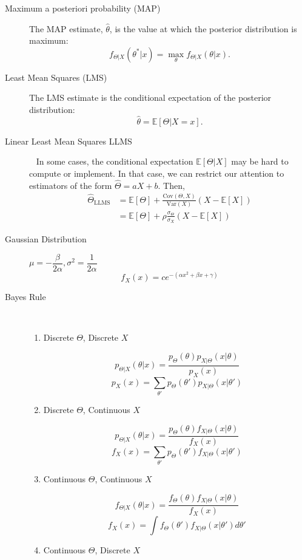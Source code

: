\documentclass[a4paper, 10pt,landscape]{article}
\newcommand{\var}{\textrm{Var}}
\newcommand{\cov}{\textrm{Cov}}
\begin{document}
\begin{multicols*}{4}
	\begin{description}
		\item[Maximum a posteriori probability (MAP)]  The MAP estimate, $\hat{\theta}$, is the value at which the posterior distribution is maximum:  $$f_{\Theta|X}(\theta^*|x)=\max\limits_{\theta}f_{\Theta|X}(\theta|x).$$
		\item[Least Mean Squares (LMS)] The LMS estimate is the conditional expectation of the posterior distribution: $$\hat{\theta}=\mathds{E}\left[\Theta|X=x\right].$$
		\item[Linear Least Mean Squares LLMS]~
			In some cases, the conditional expectation $\mathds{E}[\Theta|X]$ may be hard to compute or implement. In that case, we can restrict our attention to estimators of the form $\hat{\Theta}=aX+b.$ Then,
		\begin{align*}
			\hat{\Theta}_\text{LLMS}&=\mathds{E}[\Theta]+\frac{\cov(\Theta,X)}{\var(X)}\left(X-\mathds{E}[X]\right)\\
			&=\mathds{E}[\Theta]+\rho\frac{\sigma_\Theta}{\sigma_X}\left(X-\mathds{E}[X]\right)
		\end{align*}
		\item[Gaussian Distribution] $\mu=-\dfrac{\beta}{2\alpha}, \sigma^2=\dfrac{1}{2\alpha}$
			$$f_X(x) = c e^{-(\alpha x^2 + \beta x + \gamma)}$$
		\item[Bayes Rule]~
			\begin{enumerate}
					\item[]Discrete $\Theta$, Discrete $X$
	
					$$p_{\Theta|X}(\theta|x)=\frac{p_\Theta(\theta)p_{X|\Theta}(x|\theta)}{p_X(x)}$$
					$$p_X(x)=\sum_{\theta'}p_\Theta(\theta')p_{X|\Theta}(x|\theta')$$
					\item[]Discrete $\Theta$, Continuous $X$
					
					$$p_{\Theta|X}(\theta|x)=\frac{p_\Theta(\theta)f_{X|\Theta}(x|\theta)}{f_X(x)}$$
					$$f_X(x)=\sum_{\theta'}p_\Theta(\theta')f_{X|\Theta}(x|\theta')$$
					\item[]Continuous $\Theta$, Continuous $X$
					
					$$f_{\Theta|X}(\theta|x)=\frac{f_\Theta(\theta)f_{X|\Theta}(x|\theta)}{f_X(x)}$$
					$$f_X(x)=\int f_\Theta(\theta')f_{X|\Theta}(x|\theta')d\theta'$$
					\item[]Continuous $\Theta$, Discrete $X$
					

\end{enumerate}
\end{description}
\end{multicols*}
\end{document}
